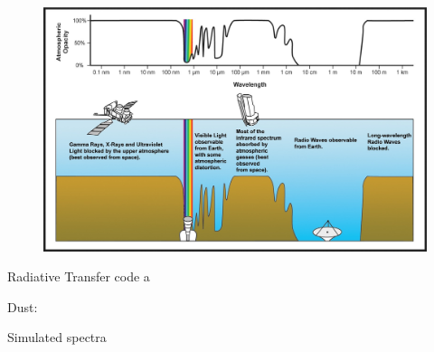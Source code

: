 \documentclass{beamer}
\begin{document}

\begin{frame}
\begin{figure}
\includegraphics[scale=0.4]{Figures/AtmosphericEM.jpg}
\end{figure}
\end{frame}


\begin{frame}{Radiative Transfer code}
a
\end{frame}


\begin{frame}{Dust:}

\end{frame}

\begin{frame}{Simulated spectra}

\end{frame}
\end{document}
